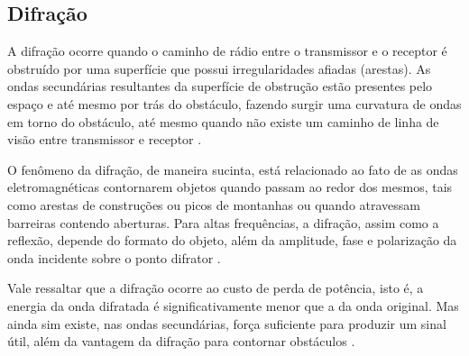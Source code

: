 \subsection{Difração}
\label{sub:difracao}

\begin{citacao}
	A difração ocorre quando o caminho de rádio entre o transmissor e o receptor é obstruído por uma superfície que possui irregularidades afiadas (arestas). As ondas secundárias resultantes da superfície de obstrução estão presentes pelo espaço e até mesmo por trás do obstáculo, fazendo surgir uma curvatura de ondas em torno do obstáculo, até mesmo quando não existe um caminho de linha de visão entre transmissor e receptor \cite{rappaport2009}.
\end{citacao}

O fenômeno da difração, de maneira sucinta, está relacionado ao fato de as ondas eletromagnéticas contornarem objetos quando passam ao redor dos mesmos, tais como arestas de construções ou picos de montanhas ou quando atravessam barreiras contendo aberturas. Para altas frequências, a difração, assim como a reflexão, depende do formato do objeto, além da amplitude, fase e polarização da onda incidente sobre o ponto difrator \cite{rappaport2009}.

\begin{figure}[H]
	\centering
\end{figure}

Vale ressaltar que a difração ocorre ao custo de perda de potência, isto é, a energia da onda difratada é significativamente menor que a da onda original. Mas ainda sim existe, nas ondas secundárias, força suficiente para produzir um sinal útil, além da vantagem da difração para contornar obstáculos \cite{flickenger2008,rappaport2009}.

